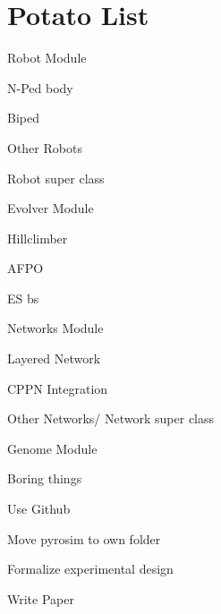 \documentclass[11pt, letterpaper]{article}
\newcommand{\cmark}{\ding{51}}%
\newcommand{\done}{\rlap{$\square$}{\raisebox{2pt}{\large\hspace{1pt}\cmark}}%
\hspace{-2.5pt}}
\begin{document}
\section*{Potato List}
\begin{todolist}
	\item Robot Module
		\begin{todolist}
			\item[\done] N-Ped body
			\item Biped
			\item Other Robots
			\item Robot super class
		\end{todolist}
	\item Evolver Module
		\begin{todolist}
			\item[\done] Hillclimber
			\item AFPO
			\item ES bs
		\end{todolist}
	\item Networks Module
		\begin{todolist}
			\item[\done] Layered Network
			\item CPPN Integration
			\item Other Networks/ Network super class
		\end{todolist}
	\item Genome Module
	\item Boring things
		\begin{todolist}
			\item[\done] Use Github
			\item Move pyrosim to own folder
			\item Formalize experimental design
			\item Write Paper
		\end{todolist}
\end{todolist}
\end{document}
